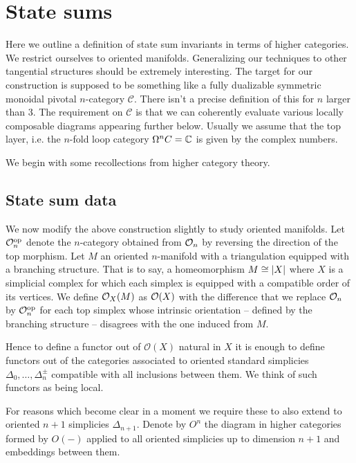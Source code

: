 
\section{State sums}

Here we outline a definition of state sum invariants in terms of higher categories.
We restrict ourselves to oriented manifolds.
Generalizing our techniques to other tangential structures should be extremely interesting.
The target for our construction is supposed to be something like a fully dualizable symmetric monoidal pivotal $n$-category $\mathcal{C}$. 
There isn't a precise definition of this for $n$ larger than 3. The requirement on $\mathcal{C}$ is that we can coherently evaluate various locally composable diagrams appearing further below. 
Usually we assume that the top layer, i.e.
the $n$-fold loop category $\Omega^nC = \mathbb{C} $ is given by the complex numbers.

We begin with some recollections from higher category theory.



\subsection{State sum data}

We now modify the above construction slightly to study oriented manifolds.
Let $\mathcal{O}_n^{\mathrm{op}}$ denote the $n$-category obtained from $\mathcal{O}_n$ by reversing the direction of the top morphism.
Let $M$ an oriented $n$-manifold with a triangulation equipped with a branching structure.
That is to say, a homeomorphism $M \cong \lvert X\rvert$ where $X$ is a simplicial complex for which each simplex is equipped with a compatible order of its vertices.
We define $\mathcal{O}_X(M)$ as $\mathcal{O}(X)$ with the difference that we replace $\mathcal{O}_n$ by $\mathcal{O}_n^{\mathrm{op}}$ for each top simplex whose intrinsic orientation -- defined by the branching structure -- disagrees with the one induced from $M$.

Hence to define a functor out of $\mathcal{O}(X)$ natural in $X$ it is enough to define functors out of the categories associated to oriented standard simplicies $\Delta_0,\dots , \Delta_n^\pm$ compatible with all inclusions between them.
We think of such functors as being local.

For reasons which become clear in a moment we require these to also extend to oriented $n+1$ simplicies $\Delta_{n+1}$.
Denote by $O^n$ the diagram in higher categories formed by $O(-)$ applied to all oriented simplicies up to dimension $n+1$ and embeddings between them.

